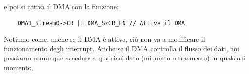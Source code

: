 e poi si attiva il DMA con la funzione:

\begin{verbatim}
    DMA1_Stream0->CR |= DMA_SxCR_EN // Attiva il DMA
\end{verbatim}

\begin{flushleft}

    \colorbox{notebox}{
    \begin{minipage}[]{\textwidth}
        Notiamo come, anche se il DMA è attivo, ciò non va a modificare il funzionamento degli interrupt. Anche se il DMA controlla il flusso dei dati, noi possiamo comunque accedere a qualsiasi dato (misurato o trasmesso) in qualsiasi momento.
    \end{minipage}
    }
\end{flushleft}